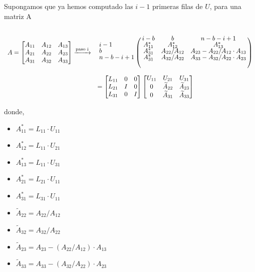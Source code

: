 \documentclass[a4paper,12pt]{article}
\begin{document}
Supongamos que ya hemos computado las $i-1$ primeras filas de $U$, para una matriz A

\begin{equation}
\begin{array}{l l}
  		A = 
  		\begin{bmatrix}
			A_{11} & A_{12} & A_{13} \\
			A_{21} & A_{22} & A_{23} \\
			A_{31} & A_{32} & A_{33}  		
  		\end{bmatrix}
  		\xrightarrow{\text{paso i}} &
  		\bordermatrix{
  				 	& i-b & b & n-b-i+1 \cr
                	i-1     & A_{11}^{*} & A_{12}^{*} & A_{13}^{*}\\
                	b       & A_{31}^{*} & A_{22}/A_{12} & A_{23} - A_{22}/A_{12}\cdot A_{13} \\
                	n-b-i+1 & A_{31}^{*} & A_{32}/A_{22} & A_{33} - A_{32}/A_{22}\cdot A_{23}
                }\\[1cm]
	  \, & = 
	  \begin{bmatrix}
			L_{11} & 0 & 0 \\
			L_{21} & I & 0 \\
			L_{31} & 0 & I	  	
	  \end{bmatrix}
	  \begin{bmatrix}
			U_{11} & U_{21} & U_{31} \\
			0 & \widetilde{A}_{22} & \widetilde{A}_{23} \\
			0 & \widetilde{A}_{31} & \widetilde{A}_{33}
	  \end{bmatrix}\\
\end{array}
\end{equation}

donde,

\begin{multicols}{2}
	\begin{itemize}
		\item $A_{11}^{*} = L_{11}\cdot U_{11}$
		\item $A_{12}^{*} = L_{11}\cdot U_{21}$
		\item $A_{13}^{*} = L_{11}\cdot U_{31}$
		\item $A_{21}^{*} = L_{21}\cdot U_{11}$
		\item $A_{31}^{*} = L_{31}\cdot U_{11}$
	\end{itemize}
	\begin{itemize}
		\item $\widetilde{A}_{22} = A_{22}/A_{12}$
		\item $\widetilde{A}_{32} = A_{32}/A_{22}$
		\item $\widetilde{A}_{23} = A_{23} - (A_{22}/A_{12})\cdot A_{13}$
		\item $\widetilde{A}_{33} = A_{33} - (A_{32}/A_{22})\cdot A_{23}$
	\end{itemize}
\end{multicols}
\end{document}
